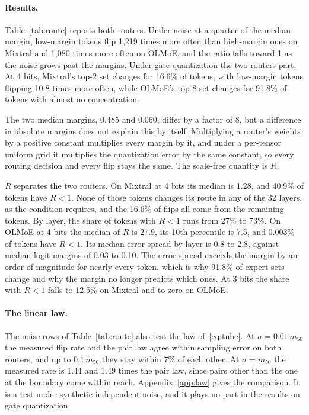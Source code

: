 \documentclass[10pt]{article}
\begin{document}
\paragraph{Results.} Table~\ref{tab:route} reports both routers. Under noise at a quarter of
the median margin, low-margin tokens flip 1{,}219 times more often than high-margin ones on Mixtral
and 1{,}080 times more often on OLMoE, and the ratio falls toward 1 as the noise grows past the
margins. Under gate quantization the two routers part. At 4 bits, Mixtral's top-2 set changes for
16.6\% of tokens, with low-margin tokens flipping 10.8 times more often, while OLMoE's top-8 set
changes for 91.8\% of tokens with almost no concentration.

The two median margins, 0.485 and 0.060, differ by a factor of 8, but a difference in
absolute margins does not explain this by itself. Multiplying a router's weights by a positive constant multiplies every margin by it, and
under a per-tensor uniform grid it multiplies the quantization error by the same constant, so
every routing decision and every flip stays the same. The scale-free quantity is $R$.

$R$ separates the two routers. On Mixtral at 4 bits its median is 1.28, and 40.9\% of tokens have
$R < 1$. None of those tokens changes its route in any of the 32 layers, as the condition
requires, and the 16.6\% of flips all come from the remaining tokens. By layer, the share of
tokens with $R < 1$ runs from 27\% to 73\%. On OLMoE at 4 bits the median of $R$ is 27.9, its
10th percentile is 7.5, and 0.003\% of tokens have $R < 1$. Its median error spread by layer is
0.8 to 2.8, against median logit margins of 0.03 to 0.10. The error spread exceeds the margin
by an order of magnitude for nearly every token, which is why 91.8\% of expert sets change and
why the margin no longer predicts which ones. At 3 bits the share with $R < 1$ falls to 12.5\% on
Mixtral and to zero on OLMoE.

\paragraph{The linear law.} The noise rows of Table~\ref{tab:route} also test the law
of~\eqref{eq:tube}. At $\sigma = 0.01\,m_{50}$ the measured flip rate and the pair law agree
within sampling error on both routers, and up to $0.1\,m_{50}$ they stay within 7\% of each
other. At $\sigma = m_{50}$ the measured rate is 1.44 and 1.49 times the pair law, since pairs
other than the one at the boundary come within reach. Appendix~\ref{app:law} gives the
comparison. It is a test under synthetic independent noise, and it plays no part in the results
on gate quantization.
\end{document}
